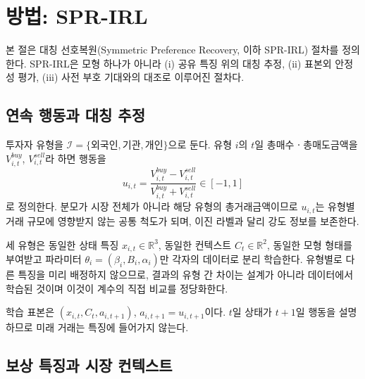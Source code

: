 %
%

\section{방법: SPR-IRL}
\label{sec:method}

본 절은 대칭 선호복원(Symmetric Preference Recovery, 이하 SPR-IRL) 절차를
정의한다. SPR-IRL은 모형 하나가 아니라 (i) 공유 특징 위의 대칭 추정, (ii) 표본외
안정성 평가, (iii) 사전 부호 기대와의 대조로 이루어진 절차다.

\subsection{연속 행동과 대칭 추정}
\label{sec:setup}

투자자 유형을 $\mathcal{I}=\{\text{외국인},\text{기관},\text{개인}\}$으로 둔다.
유형 $i$의 $t$일 총매수ㆍ총매도금액을 $V^{buy}_{i,t}$, $V^{sell}_{i,t}$라 하면
행동을
\begin{equation}
u_{i,t}=\frac{V^{buy}_{i,t}-V^{sell}_{i,t}}
             {V^{buy}_{i,t}+V^{sell}_{i,t}}\in[-1,1]
\label{eq:action}
\end{equation}
로 정의한다. 분모가 시장 전체가 아니라 해당 유형의 총거래금액이므로 $u_{i,t}$는
유형별 거래 규모에 영향받지 않는 공통 척도가 되며, 이진 라벨과 달리 강도 정보를
보존한다.

세 유형은 동일한 상태 특징 $x_{i,t}\in\mathbb{R}^{3}$, 동일한 컨텍스트
$C_t\in\mathbb{R}^{2}$, 동일한 모형 형태를 부여받고 파라미터
$\theta_i=(\beta_i,B_i,\alpha_i)$만 각자의 데이터로 분리 학습한다. 유형별로 다른
특징을 미리 배정하지 않으므로, 결과의 유형 간 차이는 설계가 아니라 데이터에서
학습된 것이며 이것이 계수의 직접 비교를 정당화한다.

학습 표본은 $(x_{i,t},C_t,a_{i,t+1})$, $a_{i,t+1}=u_{i,t+1}$이다. $t$일 상태가
$t+1$일 행동을 설명하므로 미래 거래는 특징에 들어가지 않는다.

\subsection{보상 특징과 시장 컨텍스트}
\label{sec:features}

